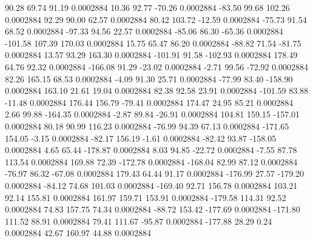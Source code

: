        90.28       69.74       91.19     0.0002884
       10.36       92.77      -70.26     0.0002884
      -83.50       99.68      102.26     0.0002884
       92.29       90.00       62.57     0.0002884
       80.42      103.72      -12.59     0.0002884
      -75.73       91.54       68.52     0.0002884
      -97.33       94.56       22.57     0.0002884
      -85.06       86.30      -65.36     0.0002884
     -101.58      107.39      170.03     0.0002884
       15.75       65.47       86.20     0.0002884
      -88.82       71.54      -81.75     0.0002884
       13.57       93.29      163.30     0.0002884
     -101.91       91.58     -102.93     0.0002884
      178.49       64.76       92.32     0.0002884
     -166.08       91.29      -23.02     0.0002884
       -2.71       99.56      -72.92     0.0002884
       82.26      165.15       68.53     0.0002884
       -4.09       91.30       25.71     0.0002884
      -77.99       83.40     -158.90     0.0002884
      163.10       21.61       19.04     0.0002884
       82.38       92.58       23.91     0.0002884
     -101.59       83.88      -11.48     0.0002884
      176.44      156.79      -79.41     0.0002884
      174.47       24.95       85.21     0.0002884
        2.66       99.88     -164.35     0.0002884
       -2.87       89.84      -26.91     0.0002884
      104.81      159.15     -157.01     0.0002884
       80.18       90.99      116.23     0.0002884
      -76.99       94.39       67.13     0.0002884
     -171.65      154.05       -3.15     0.0002884
      -82.17      156.19       -1.61     0.0002884
      -82.42       93.87     -158.05     0.0002884
        4.65       65.44     -178.87     0.0002884
        8.03       94.85      -22.72     0.0002884
       -7.55       87.78      113.54     0.0002884
      169.88       72.39     -172.78     0.0002884
     -168.04       82.99       87.12     0.0002884
      -76.97       86.32      -67.08     0.0002884
      179.43       64.44       91.17     0.0002884
     -176.99       27.57     -179.20     0.0002884
      -84.12       74.68      101.03     0.0002884
     -169.40       92.71      156.78     0.0002884
      103.21       92.14      155.81     0.0002884
      161.97      159.71      153.91     0.0002884
     -179.58      114.31       92.52     0.0002884
       74.83      157.75       74.34     0.0002884
      -88.72      153.42     -177.69     0.0002884
     -171.80      111.52       88.91     0.0002884
       79.41      111.67      -95.87     0.0002884
     -177.88       28.29        0.24     0.0002884
       42.67      160.97       44.88     0.0002884
